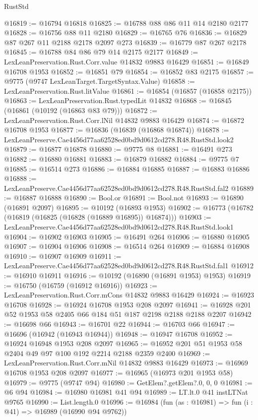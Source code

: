 \begin{lexlean}{RustStd}
\begin{coremodule}
@16819 := @16794 @16818
@16825 := @16788 @88 @86 @11 @14 @2180 @2177
@16828 := @16756 @88 @11 @2180
@16829 := @16765 @76
@16836 := @16829 @87 @267 @11 @2188 @2178 @2097 @273
@16839 := @16779 @87 @267 @2178
@16845 := @16788 @84 @86 @79 @14 @2175 @2177
@16849 := LexLeanPreservation.Rust.Corr.value @14832 @9883 @16429
@16851 := @16849 @16708 @1953
@16852 := @16851 @79
@16854 := @16852 @83 @2175
@16857 := @9775 (@9747 LexLeanTarget.TargetSyntax.Value)
@16858 := LexLeanPreservation.Rust.litValue
@16861 := @16854 (@16857 (@16858 @2175))
@16863 := LexLeanPreservation.Rust.typedLit @14832
@16868 := @16845 (@16861 (@10192 (@16863 @83 @79)))
@16872 := LexLeanPreservation.Rust.Corr.lNil @14832 @9883 @16429
@16874 := @16872 @16708 @1953
@16877 := @16836 (@16839 (@16868 @16874))
@16878 := LexLeanPreserve.Cae4456d77aa62528ed0bd9d0612cd278.R48.RustStd.look2
@16879 := @16877 @16878
@16880 := @9775 @8
@16881 := @16491 @273
@16882 := @16880 @16881
@16883 := @16879 @16882
@16884 := @9775 @7
@16885 := @16514 @273
@16886 := @16884 @16885
@16887 := @16883 @16886
@16888 := LexLeanPreserve.Cae4456d77aa62528ed0bd9d0612cd278.R48.RustStd.fal2
@16889 := @16887 @16888
@16890 := Bool.or
@16891 := Bool.not
@16893 := @16890 (@16891 @2097)
@16895 := @10192 (@16893 @1953)
@16902 := @16773 (@16782 (@16819 (@16825 (@16828 (@16889 @16895)) @16874)))
@16903 := LexLeanPreserve.Cae4456d77aa62528ed0bd9d0612cd278.R48.RustStd.look1
@16904 := @16902 @16903
@16905 := @16491 @264
@16906 := @16880 @16905
@16907 := @16904 @16906
@16908 := @16514 @264
@16909 := @16884 @16908
@16910 := @16907 @16909
@16911 := LexLeanPreserve.Cae4456d77aa62528ed0bd9d0612cd278.R48.RustStd.fal1
@16912 := @16910 @16911
@16916 := @10192 (@16890 (@16891 @1953) @1953)
@16919 := @16750 (@16759 (@16912 @16916))
@16923 := LexLeanPreservation.Rust.Corr.mCons @14832 @9883 @16429
@16924 := @16923 @16708
@16928 := @16924 @16708 @1953 @208 @2097
@16941 := @16928 @201 @52 @1953 @58 @2405 @66 @184 @51 @187 @2198 @2188 @2188 @2207
@16942 := @16698 @66
@16943 := @16701 @22
@16944 := @16703 @66
@16947 := @16696 (@16942 (@16943 @16944))
@16948 := @16947 @16708
@16952 := @16924 @16948 @1953 @208 @2097
@16965 := @16952 @201 @51 @1953 @58 @2404 @49 @97 @100 @192 @2214 @2188 @2359 @2400
@16969 := LexLeanPreservation.Rust.Corr.mNil @14832 @9883 @16429
@16973 := @16969 @16708 @1953 @208 @2097
@16977 := @16965 (@16973 @201 @1953 @58)
@16979 := @9775 (@9747 @94)
@16980 := GetElem?.getElem?.{0, 0, 0}
@16981 := @6 @94
@16984 := @16980 @16981 @41 @94
@16989 := LT.lt.{0} @41 instLTNat @9765
@16990 := List.length.{0}
@16996 := @16984 (fun (as : @16981) => fun (i : @41) => @16989 (@16990 @94 @9762))

\end{coremodule}
\end{lexlean}
